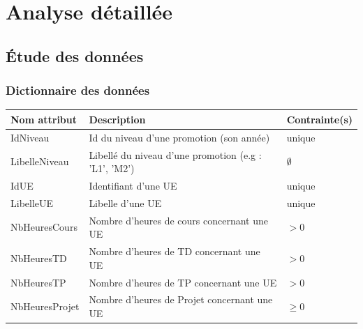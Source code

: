 \documentclass{article}
\begin{document}
\section{Analyse détaillée}

\subsection{\'Etude des données}

\subsubsection{Dictionnaire des données}

\hspace*{-0.6in}
\begin{tabular}{|p{4cm}|p{8cm}|p{5cm}|}
  \hline
  Nom attribut & Description & Contrainte(s) \\
  \hline

  IdNiveau & Id du niveau d'une promotion (son année) & unique \\

  LibelleNiveau & Libellé du niveau d'une promotion (e.g : 'L1', 'M2') & $\emptyset$ \\

  IdUE & Identifiant d'une UE & unique \\

  LibelleUE & Libelle d'une UE & unique \\

  NbHeuresCours & Nombre d'heures de cours concernant une UE & $> 0$ \\

  NbHeuresTD & Nombre d'heures de TD concernant une UE & $> 0$ \\

  NbHeuresTP & Nombre d'heures de TP concernant une UE & $> 0$ \\

  NbHeuresProjet & Nombre d'heures de Projet concernant une UE & $\geq 0$ \\





\end{tabular}
\end{document}
